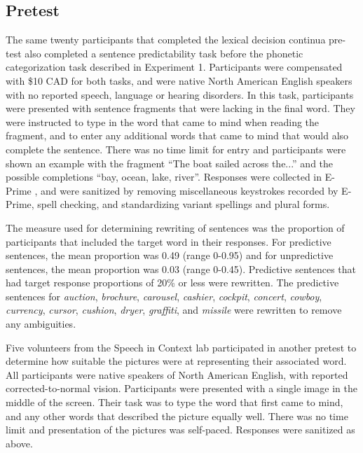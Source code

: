 \subsection{Pretest}

The same twenty participants that completed the lexical decision continua pre-test also completed a sentence predictability task before the phonetic categorization task described in Experiment 1. 
Participants were compensated with \$10 CAD for both tasks, and were native North American English speakers with no reported speech, language or hearing disorders. In this task, participants were presented with sentence fragments that were lacking in the final word.  
They were instructed to type in the word that came to mind when reading the fragment, and to enter any additional words that came to mind that would also complete the sentence.  
There was no time limit for entry and participants were shown an example with the fragment ``The boat sailed across the...'' and the possible completions ``bay, ocean, lake, river''.  
Responses were collected in E-Prime \citep{PsychologySoftwareTools2012}, and were sanitized by removing miscellaneous keystrokes recorded by E-Prime, spell checking, and standardizing variant spellings and plural forms.

The measure used for determining rewriting of sentences was the proportion of participants that included the target word in their responses.  
For predictive sentences, the mean proportion was 0.49 (range 0-0.95) and for unpredictive sentences, the mean proportion was 0.03 (range 0-0.45).  
Predictive sentences that had target response proportions of 20\% or less were rewritten.  
The predictive sentences for \emph{auction}, \emph{brochure}, \emph{carousel}, \emph{cashier}, \emph{cockpit}, \emph{concert}, \emph{cowboy}, \emph{currency}, \emph{cursor}, \emph{cushion}, \emph{dryer}, \emph{graffiti}, and \emph{missile} were rewritten to remove any ambiguities.  

Five volunteers from the Speech in Context lab participated in another pretest to determine how suitable the pictures were at representing their associated word.  
All participants were native speakers of North American English, with reported corrected-to-normal vision. Participants were presented with a single image in the middle of the screen.  
Their task was to type the word that first came to mind, and any other words that described the picture equally well.  
There was no time limit and presentation of the pictures was self-paced. Responses were sanitized as above.  

